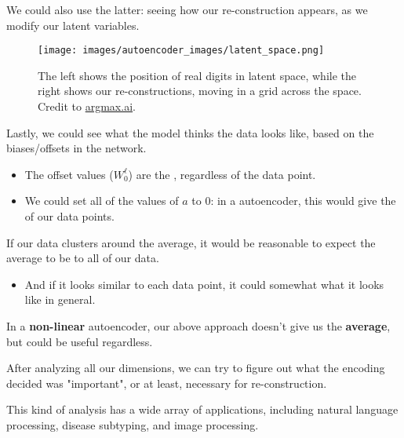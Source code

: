         \miniex We could also use the latter: seeing how our re-construction appears, as we modify our latent variables.

        \begin{figure}[H]
            \centering
            \texttt{[image: images/autoencoder\_images/latent\_space.png]}
            \caption*{The left shows the position of real digits in latent space, while the right shows our re-constructions, moving in a grid across the space. Credit to \href{https://argmax.ai/blog/vhp-vae/}{argmax.ai}.}
        \end{figure}

        \begin{concept}
            Lastly, we could see what the model thinks the data  looks like, based on the biases/offsets in the network.
                \begin{itemize}
                    \item The offset values ($W_0^\ell$) are the , regardless of the data point.
                    
                    \item We could set all of the values of $a$ to 0: in a  autoencoder, this would give the  of our data points. 
                \end{itemize}

                \subsecdiv

            If our data clusters around the average, it would be reasonable to expect the average to be  to all of our data.

            \begin{itemize}
                \item And if it looks similar to each data point, it could somewhat  what it looks like in general.
            \end{itemize}

            In a \textbf{non-linear} autoencoder, our above approach doesn't give us the \textbf{average}, but could be useful regardless.
        \end{concept}


        After analyzing all our dimensions, we can try to figure out what  the encoding decided was "important", or at least, necessary for re-construction.

        This kind of analysis has a wide array of applications, including natural language processing, disease subtyping, and image processing.

